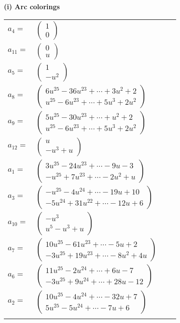 \documentclass[1p]{elsarticle_modified}
\theoremstyle{definition}
\begin{document}
\flushleft \textbf{(i) Arc colorings}\\
\begin{tabular}{m{7pt} m{180pt} m{7pt} m{180pt} }
\flushright $a_{4}=$&$\begin{pmatrix}1\\0\end{pmatrix}$ \\
\flushright $a_{11}=$&$\begin{pmatrix}0\\u\end{pmatrix}$ \\
\flushright $a_{5}=$&$\begin{pmatrix}1\\- u^2\end{pmatrix}$ \\
\flushright $a_{8}=$&$\begin{pmatrix}6 u^{25}-36 u^{23}+\cdots+3 u^2+2\\u^{25}-6 u^{23}+\cdots+5 u^3+2 u^2\end{pmatrix}$ \\
\flushright $a_{9}=$&$\begin{pmatrix}5 u^{25}-30 u^{23}+\cdots+u^2+2\\u^{25}-6 u^{23}+\cdots+5 u^3+2 u^2\end{pmatrix}$ \\
\flushright $a_{12}=$&$\begin{pmatrix}u\\- u^3+u\end{pmatrix}$ \\
\flushright $a_{1}=$&$\begin{pmatrix}3 u^{25}-24 u^{23}+\cdots-9 u-3\\- u^{25}+7 u^{23}+\cdots-2 u^2+u\end{pmatrix}$ \\
\flushright $a_{3}=$&$\begin{pmatrix}- u^{25}-4 u^{24}+\cdots-19 u+10\\-5 u^{24}+31 u^{22}+\cdots-12 u+6\end{pmatrix}$ \\
\flushright $a_{10}=$&$\begin{pmatrix}- u^3\\u^5- u^3+u\end{pmatrix}$ \\
\flushright $a_{7}=$&$\begin{pmatrix}10 u^{25}-61 u^{23}+\cdots-5 u+2\\-3 u^{25}+19 u^{23}+\cdots-8 u^2+4 u\end{pmatrix}$ \\
\flushright $a_{6}=$&$\begin{pmatrix}11 u^{25}-2 u^{24}+\cdots+6 u-7\\-3 u^{25}+9 u^{24}+\cdots+28 u-12\end{pmatrix}$ \\
\flushright $a_{2}=$&$\begin{pmatrix}10 u^{25}-4 u^{24}+\cdots-32 u+7\\5 u^{25}-5 u^{24}+\cdots-7 u+6\end{pmatrix}$\\&\end{tabular}
\end{document}
